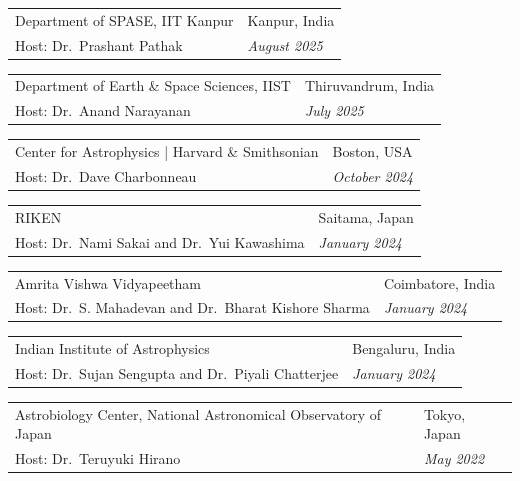 \documentclass[10pt,a4paper]{article}
\makeatletter
\newcommand{\invitedtalkentry}[4]{%
\begin{tabularx}{\textwidth}{
    @{}
    >{\raggedright\arraybackslash}X
    >{\raggedleft\arraybackslash}p{4.5cm}
    @{}
}
#1 & #2 \\
\textcolor{entrylight}{Host: #3} &
\textcolor{entrylight}{\emph{#4}}
\end{tabularx}
\vspace{2pt}
}
\makeatother
\begin{document}
\invitedtalkentry
{Department of SPASE, IIT Kanpur}
{Kanpur, India}
{Dr.\ Prashant Pathak}
{August 2025}

\invitedtalkentry
{Department of Earth \& Space Sciences, IIST}
{Thiruvandrum, India}
{Dr.\ Anand Narayanan}
{July 2025}

\invitedtalkentry
{Center for Astrophysics | Harvard \& Smithsonian}
{Boston, USA}
{Dr.\ Dave Charbonneau}
{October 2024}

\invitedtalkentry
{RIKEN}
{Saitama, Japan}
{Dr.\ Nami Sakai and Dr.\ Yui Kawashima}
{January 2024}

\invitedtalkentry
{Amrita Vishwa Vidyapeetham}
{Coimbatore, India}
{Dr.\ S. Mahadevan and Dr.\ Bharat Kishore Sharma}
{January 2024}

\invitedtalkentry
{Indian Institute of Astrophysics}
{Bengaluru, India}
{Dr.\ Sujan Sengupta and Dr.\ Piyali Chatterjee}
{January 2024}

\invitedtalkentry
{Astrobiology Center, National Astronomical Observatory of Japan}
{Tokyo, Japan}
{Dr.\ Teruyuki Hirano}
{May 2022}
\end{document}
